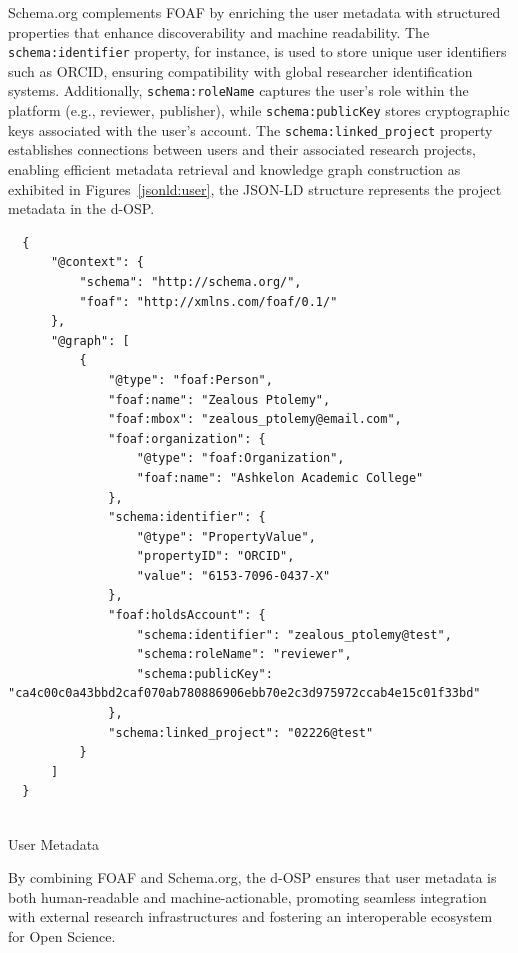 \documentclass[final]{rc-book-2.14}
\begin{document}
Schema.org complements FOAF by enriching the user metadata with structured properties that enhance discoverability and machine readability. The \texttt{schema:identifier} property, for instance, is used to store unique user identifiers such as ORCID, ensuring compatibility with global researcher identification systems. Additionally, \texttt{schema:roleName} captures the user’s role within the platform (e.g., reviewer, publisher), while \texttt{schema:publicKey} stores cryptographic keys associated with the user’s account. The \texttt{schema:linked\_project} property establishes connections between users and their associated research projects, enabling efficient metadata retrieval and knowledge graph construction as exhibited in Figures~\ref{jsonld:user}, the JSON-LD structure represents the project metadata in the d-OSP.

\begin{listing}
\begin{verbatim}
  {
      "@context": {
          "schema": "http://schema.org/",
          "foaf": "http://xmlns.com/foaf/0.1/"
      },
      "@graph": [
          {
              "@type": "foaf:Person",
              "foaf:name": "Zealous Ptolemy",
              "foaf:mbox": "zealous_ptolemy@email.com",
              "foaf:organization": {
                  "@type": "foaf:Organization",
                  "foaf:name": "Ashkelon Academic College"
              },
              "schema:identifier": {
                  "@type": "PropertyValue",
                  "propertyID": "ORCID",
                  "value": "6153-7096-0437-X"
              },
              "foaf:holdsAccount": {
                  "schema:identifier": "zealous_ptolemy@test",
                  "schema:roleName": "reviewer",
                  "schema:publicKey": "ca4c00c0a43bbd2caf070ab780886906ebb70e2c3d975972ccab4e15c01f33bd"
              },
              "schema:linked_project": "02226@test"
          }
      ]
  }
  
\end{verbatim}
\caption{User Metadata}
\label{jsonld:user}
\end{listing}


By combining FOAF and Schema.org, the d-OSP ensures that user metadata is both human-readable and machine-actionable, promoting seamless integration with external research infrastructures and fostering an interoperable ecosystem for Open Science.
\end{document}

